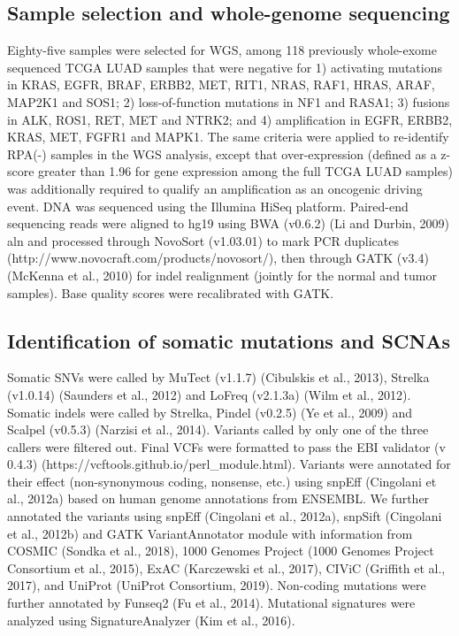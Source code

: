 \documentclass[phd,tocprelim]{cornell}
\begin{document}
\subsection*{Sample selection and whole-genome sequencing}
Eighty-five samples were selected for WGS, among 118 previously whole-exome sequenced TCGA LUAD samples that were negative for 1) activating mutations in KRAS, EGFR, BRAF, ERBB2, MET, RIT1, NRAS, RAF1, HRAS, ARAF, MAP2K1 and SOS1; 2) loss-of-function mutations in NF1 and RASA1; 3) fusions in ALK, ROS1, RET, MET and NTRK2; and 4) amplification in EGFR, ERBB2, KRAS, MET, FGFR1 and MAPK1. The same criteria were applied to re-identify RPA(-) samples in the WGS analysis, except that over-expression (defined as a z-score greater than 1.96 for gene expression among the full TCGA LUAD samples) was additionally required to qualify an amplification as an oncogenic driving event.
DNA was sequenced using the Illumina HiSeq platform. Paired-end sequencing reads were aligned to hg19 using BWA (v0.6.2) (Li and Durbin, 2009) aln and processed through NovoSort (v1.03.01) to mark PCR duplicates (http://www.novocraft.com/products/novosort/), then through GATK (v3.4) (McKenna et al., 2010) for indel realignment (jointly for the normal and tumor samples). Base quality scores were recalibrated with GATK.

\subsection*{Identification of somatic mutations and SCNAs}
Somatic SNVs were called by MuTect (v1.1.7) (Cibulskis et al., 2013), Strelka (v1.0.14) (Saunders et al., 2012) and LoFreq (v2.1.3a) (Wilm et al., 2012). Somatic indels were called by Strelka, Pindel (v0.2.5) (Ye et al., 2009) and Scalpel (v0.5.3) (Narzisi et al., 2014). Variants called by only one of the three callers were filtered out. Final VCFs were formatted to pass the EBI validator (v 0.4.3) (https://vcftools.github.io/perl\_module.html). Variants were annotated for their effect (non-synonymous coding, nonsense, etc.) using snpEff (Cingolani et al., 2012a) based on human genome annotations from ENSEMBL. We further annotated the variants using snpEff (Cingolani et al., 2012a), snpSift (Cingolani et al., 2012b) and GATK VariantAnnotator module with information from COSMIC (Sondka et al., 2018), 1000 Genomes Project (1000 Genomes Project Consortium et al., 2015), ExAC (Karczewski et al., 2017), CIViC (Griffith et al., 2017), and UniProt (UniProt Consortium, 2019). Non-coding mutations were further annotated by Funseq2 (Fu et al., 2014). Mutational signatures were analyzed using SignatureAnalyzer (Kim et al., 2016).
\end{document}
